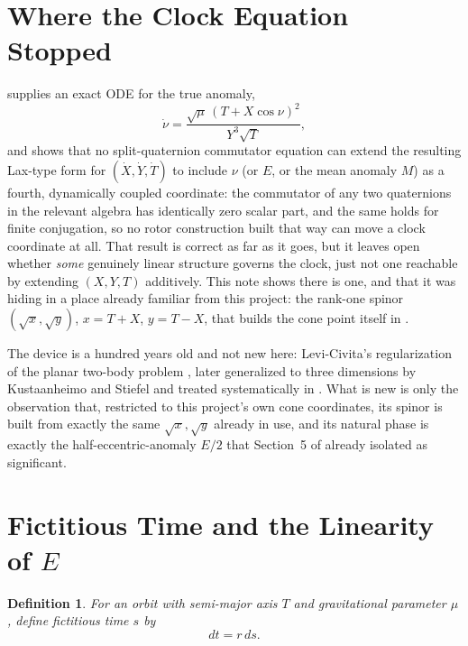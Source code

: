 \documentclass[12pt]{amsart}
\theoremstyle{plain}
\newtheorem{definition}[theorem]{Definition}
\theoremstyle{remark}
\begin{document}
\begin{abstract}
\end{abstract}

\section{Where the Clock Equation Stopped}

\cite{Ebert2026Clock} supplies an exact ODE for the true anomaly,
\[
\dot\nu=\frac{\sqrt\mu\,(T+X\cos\nu)^2}{Y^3\sqrt T},
\]
and shows that no split-quaternion commutator equation can extend the resulting Lax-type form for $(\dot X,\dot Y,\dot T)$ to include $\nu$ (or $E$, or the mean anomaly $M$) as a fourth, dynamically coupled coordinate: the commutator of any two quaternions in the relevant algebra has identically zero scalar part, and the same holds for finite conjugation, so no rotor construction built that way can move a clock coordinate at all. That result is correct as far as it goes, but it leaves open whether \emph{some} genuinely linear structure governs the clock, just not one reachable by extending $(X,Y,T)$ additively. This note shows there is one, and that it was hiding in a place already familiar from this project: the rank-one spinor $(\sqrt x,\sqrt y)$, $x=T+X$, $y=T-X$, that builds the cone point itself in \cite{Ebert2026EigenCoord,Ebert2026Quantum}.

The device is a hundred years old and not new here: Levi-Civita's regularization of the planar two-body problem \cite{LeviCivita1920,Bohlin1911}, later generalized to three dimensions by Kustaanheimo and Stiefel \cite{KustaanheimoStiefel1965} and treated systematically in \cite{StiefelScheifele1971}. What is new is only the observation that, restricted to this project's own cone coordinates, its spinor is built from exactly the same $\sqrt x,\sqrt y$ already in use, and its natural phase is exactly the half-eccentric-anomaly $E/2$ that Section~5 of \cite{Ebert2026Clock} already isolated as significant.

\section{Fictitious Time and the Linearity of \texorpdfstring{$E$}{E}}

\begin{definition}
For an orbit with semi-major axis $T$ and gravitational parameter $\mu$, define fictitious time $s$ by
\begin{equation}
dt = r\,ds. \tag{1}
\end{equation}
\end{definition}
\end{document}
